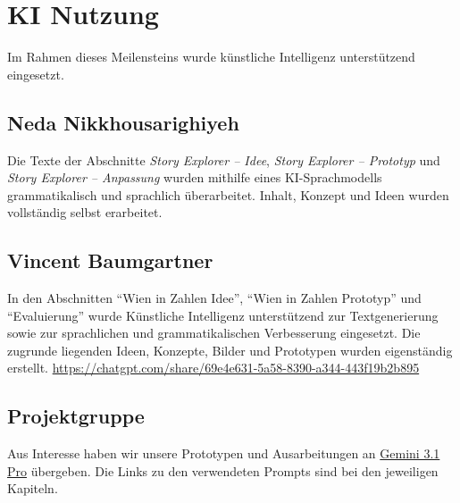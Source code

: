 \section{KI Nutzung}
\label{sec:KI}
%
\noindent
Im Rahmen dieses Meilensteins wurde künstliche Intelligenz unterstützend eingesetzt.
%
\subsection*{Neda Nikkhousarighiyeh}
Die Texte der Abschnitte \textit{Story Explorer – Idee}, \textit{Story Explorer – Prototyp} und
\textit{Story Explorer – Anpassung} wurden mithilfe eines KI-Sprachmodells
grammatikalisch und sprachlich überarbeitet. Inhalt, Konzept und Ideen
wurden vollständig selbst erarbeitet.
%
\subsection*{Vincent Baumgartner} 
In den Abschnitten ``Wien in Zahlen Idee'', ``Wien in Zahlen Prototyp'' und ``Evaluierung'' wurde K\"unstliche Intelligenz unterst\"utzend zur Textgenerierung sowie zur sprachlichen und grammatikalischen Verbesserung eingesetzt. Die zugrunde liegenden Ideen, Konzepte, Bilder und Prototypen wurden eigenst\"andig erstellt. \url{https://chatgpt.com/share/69e4e631-5a58-8390-a344-443f19b2b895}
%
\subsection*{Projektgruppe}
Aus Interesse haben wir unsere Prototypen und Ausarbeitungen an \href{https://deepmind.google/models/gemini/pro/}{Gemini 3.1 Pro} übergeben. Die Links zu den verwendeten Prompts sind bei den jeweiligen Kapiteln.